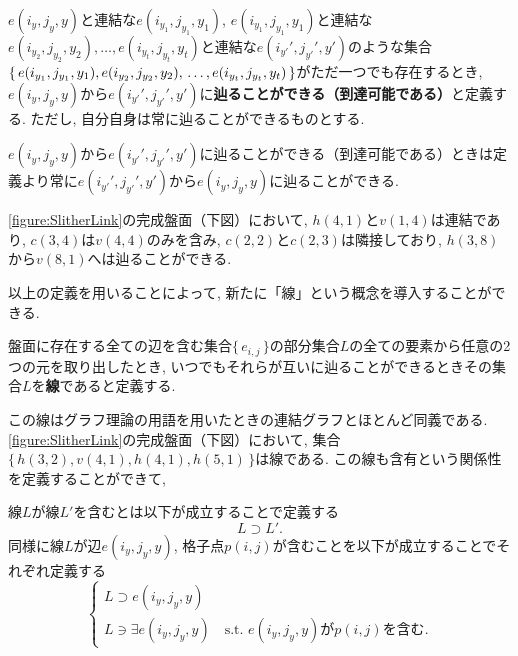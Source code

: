 \begin{definition}[到達可能]
  $e(i_y,j_y,y)$と連結な$e(i_{y_1},j_{y_1},y_1)$, $e(i_{y_1},j_{y_1},y_1)$と連結な$e(i_{y_2},j_{y_2},y_2),\ldots,e(i_{y_t},j_{y_t},y_t)$と連結な$e(i_{y'}',j_{y'}',y')$のような集合$\{\,e(i_{y_1},j_{y_1},y_1),e(i_{y_2},j_{y_2},y_2),\\
    \ldots,e(i_{y_t},j_{y_t},y_t)\,\}$がただ一つでも存在するとき, $e(i_y,j_y,y)$から$e(i_{y'}',j_{y'}',y')$に\textbf{辿ることができる（到達可能である）}と定義する. ただし, 自分自身は常に辿ることができるものとする.
\end{definition}

\begin{remark}
  $e(i_y,j_y,y)$から$e(i_{y'}',j_{y'}',y')$に辿ることができる（到達可能である）ときは定義より常に$e(i_{y'}',j_{y'}',y')$から$e(i_y,j_y,y)$に辿ることができる.
\end{remark}

\begin{example}[連結, 含有, 隣接, 到達可能]
  \cref{figure:SlitherLink}の完成盤面（下図）において, $h(4,1)$と$v(1,4)$は連結であり, $c(3,4)$は$v(4,4)$のみを含み, $c(2,2)$と$c(2,3)$は隣接しており, $h(3,8)$から$v(8,1)$へは辿ることができる.
\end{example}
以上の定義を用いることによって, 新たに「線」という概念を導入することができる.

\begin{definition}[線]\label{definition:Line}
  盤面に存在する全ての辺を含む集合$\{\,e_{i,j}\,\}$の部分集合$L$の全ての要素から任意の2つの元を取り出したとき, いつでもそれらが互いに辿ることができるときその集合$L$を\textbf{線}であると定義する.
\end{definition}
この線はグラフ理論の用語を用いたときの連結グラフとほとんど同義である. \cref{figure:SlitherLink}の完成盤面（下図）において, 集合$\{\,h(3,2),v(4,1),h(4,1),h(5,1)\,\}$は線である. この線も含有という関係性を定義することができて,
\begin{definition}[線の含有]
  線$L$が線$L'$を含むとは以下が成立することで定義する
  \begin{equation}
    L\supset L'.
  \end{equation}
  同様に線$L$が辺$e(i_y,j_y,y)$, 格子点$p(i,j)$が含むことを以下が成立することでそれぞれ定義する
  \begin{equation}
    \begin{cases}
      {L\supset  e(i_y,j_y,y) } \\
      {L\ni \exists e(i_y,j_y,y) \quad \mbox{s.t. $e(i_y,j_y,y)$が$p(i,j)$を含む}}.
    \end{cases}
  \end{equation}
\end{definition}

